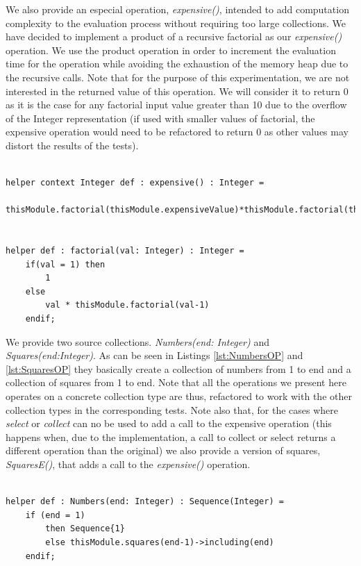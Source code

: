 We also provide an especial operation, \emph{expensive()}, intended to
add computation complexity to the evaluation process without requiring too large
collections. We have decided to implement a product of a recursive factorial as
our \emph{expensive()} operation. We use the product operation in
order to increment the evaluation time for the operation while avoiding the 
exhaustion of the memory heap due to the recursive calls. Note that for the
purpose of this experimentation, we are not interested in the returned value of
this operation. We will consider it to return 0 as it is the case for any
factorial input value greater than 10 due to the overflow of the Integer
representation (if used with smaller values of factorial, the expensive
operation would need to be refactored to return 0 as other values may distort
the results of the tests).

\begin{lstlisting}[language=ATL, style=AMMA,
label=lst:expensiveOP, caption=expensive() operation] 

helper context Integer def : expensive() : Integer =
	thisModule.factorial(thisModule.expensiveValue)*thisModule.factorial(thisModule.expensiveValue);
		

helper def : factorial(val: Integer) : Integer =
	if(val = 1) then 
		1
	else
		val * thisModule.factorial(val-1)
	endif;

\end{lstlisting}


We provide two source collections. \emph{Numbers(end: Integer)} and
\emph{Squares(end:Integer)}. As can be seen in Listings \ref{lst:NumbersOP} and
\ref{lst:SquaresOP} they basically create a collection of numbers from 1 to end
and a collection of squares from 1 to end. Note that all the operations we
present here operates on a concrete collection type are thus, refactored to work
with the other collection types in the corresponding tests. Note also that, for
the cases where \emph{select} or \emph{collect} can no be used to add a call to
the expensive operation (this happens when, due to the implementation, a call to
collect or select returns a different operation than the original) we also
provide a version of squares, \emph{SquaresE()}, that adds a call to the
\emph{expensive()} operation.

\begin{lstlisting}[language=ATL, style=AMMA,
label=lst:NumbersOP, caption=Numbers() operation] 

helper def : Numbers(end: Integer) : Sequence(Integer) =
	if (end = 1)
		then Sequence{1}
		else thisModule.squares(end-1)->including(end)
	endif;


\end{lstlisting}

